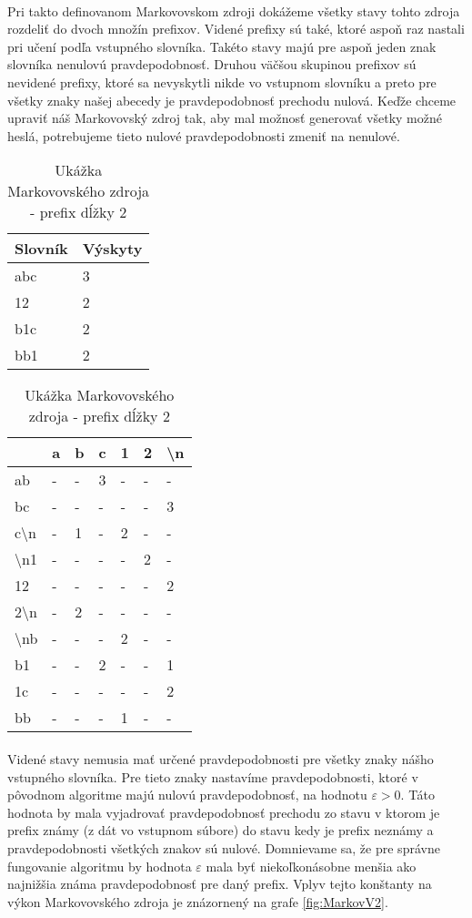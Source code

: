 \paragraph{}
Pri takto definovanom Markovovskom zdroji dokážeme všetky stavy tohto zdroja rozdeliť do dvoch množín prefixov. Videné prefixy sú také, ktoré aspoň raz nastali pri učení podľa vstupného slovníka. Takéto stavy majú pre aspoň jeden znak slovníka nenulovú pravdepodobnosť. Druhou väčšou skupinou prefixov sú nevidené prefixy, ktoré sa nevyskytli nikde vo vstupnom slovníku a preto pre všetky znaky našej abecedy je pravdepodobnosť prechodu nulová. Keďže chceme upraviť náš Markovovský zdroj tak, aby mal možnosť generovať všetky možné heslá, potrebujeme tieto nulové pravdepodobnosti zmeniť na nenulové. 

\begin{table}[]
\centering
\caption{Ukážka Markovovského zdroja - prefix dĺžky 2}
\label{tbl:MarkovZdroj}
\begin{tabular}{ll}
Slovník & Výskyty\\ \hline
abc & 3 \\
12 & 2 \\
b1c & 2 \\
bb1 & 2
\end{tabular}
\quad
\begin{tabular}{l|llllll}
	& a & b & c & 1 & 2 & \textbackslash{}n \\ \hline
ab 	& -	& - & 3 & - & - & - \\
bc 	& - & - & - & - & - & 3 \\
c\textbackslash{}n & - & 1 & - & 2 & - & - \\
\textbackslash{}n1 & - & - & - & - & 2 & - \\
12 & - & - & - & - & - & 2 \\
2\textbackslash{}n & - & 2 & - & - & - & - \\
\textbackslash{}nb & - & - & - & 2 & - & - \\
b1 & - & - & 2 & - & - & 1\\
1c & - & - & - & - & - & 2 \\
bb & - & - & - & 1 & - & -
\end{tabular}
\end{table}

\paragraph{}
Videné stavy nemusia mať určené pravdepodobnosti pre všetky znaky nášho vstupného slovníka. Pre tieto znaky nastavíme pravdepodobnosti, ktoré v pôvodnom algoritme majú nulovú pravdepodobnosť, na hodnotu \(\varepsilon > 0\). Táto hodnota by mala vyjadrovať pravdepodobnosť prechodu zo stavu v ktorom je prefix známy (z dát vo vstupnom súbore) do stavu kedy je prefix neznámy a pravdepodobnosti všetkých znakov sú nulové. Domnievame sa, že pre správne fungovanie algoritmu by hodnota \(\varepsilon\) mala byť niekoľkonásobne menšia ako najnižšia známa pravdepodobnosť pre daný prefix. Vplyv tejto konštanty na výkon Markovovského zdroja je znázornený na grafe \ref{fig:MarkovV2}.

